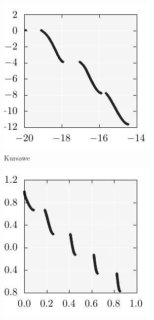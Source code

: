 \documentclass{stdlocal}
\begin{document}
    \begin{figure}[t]
      \center
      \begin{subfigure}[b]{0.24\textwidth}
        \center
        \includegraphics[width=\textwidth]{../../plots/kursawe.pdf}
        \caption{Kursawe}
      \end{subfigure}
      \begin{subfigure}[b]{0.24\textwidth}
        \center
        \includegraphics[width=\textwidth]{../../plots/zdt3.pdf}

\end{subfigure}
\end{figure}
\end{document}
